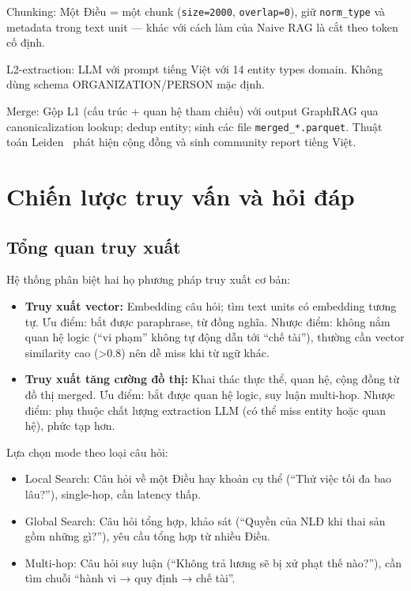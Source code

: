 \documentclass[../DoAn.tex]{subfiles}
\begin{document}
Chunking: Một Điều = một chunk (\texttt{size=2000}, \texttt{overlap=0}), giữ \texttt{norm\_type} và metadata trong text unit --- khác với cách làm của Naive RAG là cắt theo token cố định.

L2-extraction: LLM với prompt tiếng Việt với 14 entity types domain. Không dùng schema ORGANIZATION/PERSON mặc định.

Merge: Gộp L1 (cấu trúc + quan hệ tham chiếu) với output GraphRAG qua canonicalization lookup; dedup entity; sinh các file \texttt{merged\_*.parquet}. Thuật toán Leiden~\cite{traag2019leiden} phát hiện cộng đồng và sinh community report tiếng Việt.

\section{Chiến lược truy vấn và hỏi đáp}
\label{section:3.3}

\subsection{Tổng quan truy xuất}
\label{subsection:3.3.1}

Hệ thống phân biệt hai họ phương pháp truy xuất cơ bản:

\begin{itemize}[nosep, leftmargin=*]
    \item \textbf{Truy xuất vector:} Embedding câu hỏi; tìm text units có embedding tương tự. Ưu điểm: bắt được paraphrase, từ đồng nghĩa. Nhược điểm: không nắm quan hệ logic (``vi phạm'' không tự động dẫn tới ``chế tài''), thường cần vector similarity cao (>0.8) nên dễ miss khi từ ngữ khác.
    
    \item \textbf{Truy xuất tăng cường đồ thị:} Khai thác thực thể, quan hệ, cộng đồng từ đồ thị merged. Ưu điểm: bắt được quan hệ logic, suy luận multi-hop. Nhược điểm: phụ thuộc chất lượng extraction LLM (có thể miss entity hoặc quan hệ), phức tạp hơn.
\end{itemize}

Lựa chọn mode theo loại câu hỏi:
\begin{itemize}[nosep, leftmargin=*]
    \item Local Search: Câu hỏi về một Điều hay khoản cụ thể (``Thử việc tối đa bao lâu?''), single-hop, cần latency thấp.
    \item Global Search: Câu hỏi tổng hợp, khảo sát (``Quyền của NLĐ khi thai sản gồm những gì?''), yêu cầu tổng hợp từ nhiều Điều.
    \item Multi-hop: Câu hỏi suy luận (``Không trả lương sẽ bị xử phạt thế nào?''), cần tìm chuỗi ``hành vi → quy định → chế tài''.
\end{itemize}
\end{document}
